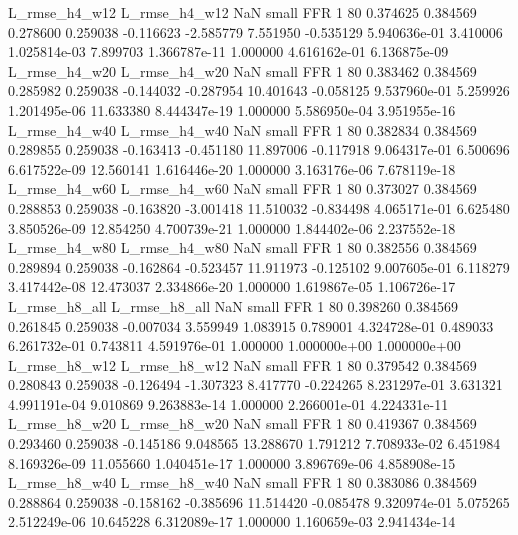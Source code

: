  L_rmse_h4_w12  L_rmse_h4_w12                   NaN      small      FFR                 1 80 0.374625       0.384569 0.278600       0.259038   -0.116623     -2.585779      7.551950    -0.535129   5.940636e-01  3.410006 1.025814e-03     7.899703   1.366787e-11            1.000000    4.616162e-01        6.136875e-09
 L_rmse_h4_w20  L_rmse_h4_w20                   NaN      small      FFR                 1 80 0.383462       0.384569 0.285982       0.259038   -0.144032     -0.287954     10.401643    -0.058125   9.537960e-01  5.259926 1.201495e-06    11.633380   8.444347e-19            1.000000    5.586950e-04        3.951955e-16
 L_rmse_h4_w40  L_rmse_h4_w40                   NaN      small      FFR                 1 80 0.382834       0.384569 0.289855       0.259038   -0.163413     -0.451180     11.897006    -0.117918   9.064317e-01  6.500696 6.617522e-09    12.560141   1.616446e-20            1.000000    3.163176e-06        7.678119e-18
 L_rmse_h4_w60  L_rmse_h4_w60                   NaN      small      FFR                 1 80 0.373027       0.384569 0.288853       0.259038   -0.163820     -3.001418     11.510032    -0.834498   4.065171e-01  6.625480 3.850526e-09    12.854250   4.700739e-21            1.000000    1.844402e-06        2.237552e-18
 L_rmse_h4_w80  L_rmse_h4_w80                   NaN      small      FFR                 1 80 0.382556       0.384569 0.289894       0.259038   -0.162864     -0.523457     11.911973    -0.125102   9.007605e-01  6.118279 3.417442e-08    12.473037   2.334866e-20            1.000000    1.619867e-05        1.106726e-17
 L_rmse_h8_all  L_rmse_h8_all                   NaN      small      FFR                 1 80 0.398260       0.384569 0.261845       0.259038   -0.007034      3.559949      1.083915     0.789001   4.324728e-01  0.489033 6.261732e-01     0.743811   4.591976e-01            1.000000    1.000000e+00        1.000000e+00
 L_rmse_h8_w12  L_rmse_h8_w12                   NaN      small      FFR                 1 80 0.379542       0.384569 0.280843       0.259038   -0.126494     -1.307323      8.417770    -0.224265   8.231297e-01  3.631321 4.991191e-04     9.010869   9.263883e-14            1.000000    2.266001e-01        4.224331e-11
 L_rmse_h8_w20  L_rmse_h8_w20                   NaN      small      FFR                 1 80 0.419367       0.384569 0.293460       0.259038   -0.145186      9.048565     13.288670     1.791212   7.708933e-02  6.451984 8.169326e-09    11.055660   1.040451e-17            1.000000    3.896769e-06        4.858908e-15
 L_rmse_h8_w40  L_rmse_h8_w40                   NaN      small      FFR                 1 80 0.383086       0.384569 0.288864       0.259038   -0.158162     -0.385696     11.514420    -0.085478   9.320974e-01  5.075265 2.512249e-06    10.645228   6.312089e-17            1.000000    1.160659e-03        2.941434e-14
